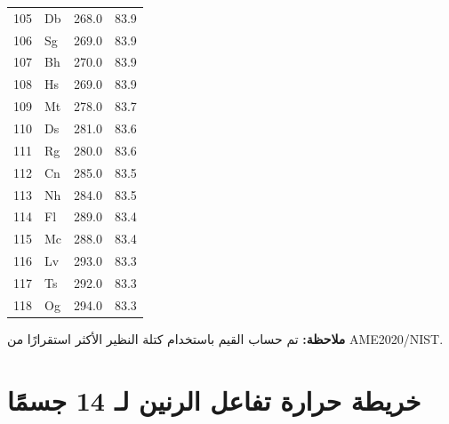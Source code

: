 \documentclass[12pt,a4paper]{article}
\begin{document}
\begin{longtable}{c l c c}
		105& Db  & 268.0  & 83.9 \\
		106& Sg  & 269.0  & 83.9 \\
		107& Bh  & 270.0  & 83.9 \\
		108& Hs  & 269.0  & 83.9 \\
		109& Mt  & 278.0  & 83.7 \\
		110& Ds  & 281.0  & 83.6 \\
		111& Rg  & 280.0  & 83.6 \\
		112& Cn  & 285.0  & 83.5 \\
		113& Nh  & 284.0  & 83.5 \\
		114& Fl  & 289.0  & 83.4 \\
		115& Mc  & 288.0  & 83.4 \\
		116& Lv  & 293.0  & 83.3 \\
		117& Ts  & 292.0  & 83.3 \\
		118& Og  & 294.0  & 83.3 \\
		\bottomrule
	\end{longtable}
	\vspace{0.5cm}
	\noindent
	\textbf{ملاحظة:} تم حساب القيم باستخدام كتلة النظير الأكثر استقرارًا من AME2020/NIST.
	
	\clearpage   %
	
	\section*{خريطة حرارة تفاعل الرنين لـ 14 جسمًا}
	
\end{document}
